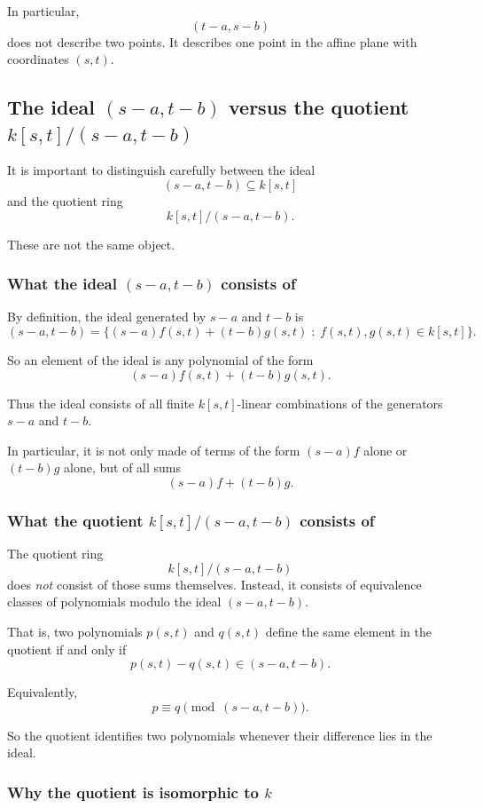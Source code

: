 \documentclass[12pt,a4paper]{article}
\theoremstyle{notespace}
\theoremstyle{definition}
\begin{document}
In particular,
\[
(t-a,s-b)
\]
does not describe two points. It describes one point in the affine plane with coordinates \((s,t)\).

\subsection{The ideal \((s-a,t-b)\) versus the quotient \(k[s,t]/(s-a,t-b)\)}

It is important to distinguish carefully between the ideal
\[
(s-a,t-b)\subseteq k[s,t]
\]
and the quotient ring
\[
k[s,t]/(s-a,t-b).
\]

These are not the same object.

\subsubsection{What the ideal \((s-a,t-b)\) consists of}

By definition, the ideal generated by \(s-a\) and \(t-b\) is
\[
(s-a,t-b)
=
\{(s-a)f(s,t)+(t-b)g(s,t)\;:\; f(s,t),g(s,t)\in k[s,t]\}.
\]

So an element of the ideal is any polynomial of the form
\[
(s-a)f(s,t)+(t-b)g(s,t).
\]

Thus the ideal consists of all finite \(k[s,t]\)-linear combinations of the generators \(s-a\) and \(t-b\).

In particular, it is not only made of terms of the form \((s-a)f\) alone or \((t-b)g\) alone, but of all sums
\[
(s-a)f+(t-b)g.
\]

\subsubsection{What the quotient \(k[s,t]/(s-a,t-b)\) consists of}

The quotient ring
\[
k[s,t]/(s-a,t-b)
\]
does \emph{not} consist of those sums themselves.  
Instead, it consists of equivalence classes of polynomials modulo the ideal \((s-a,t-b)\).

That is, two polynomials \(p(s,t)\) and \(q(s,t)\) define the same element in the quotient if and only if
\[
p(s,t)-q(s,t)\in (s-a,t-b).
\]

Equivalently,
\[
p \equiv q \pmod{(s-a,t-b)}.
\]

So the quotient identifies two polynomials whenever their difference lies in the ideal.

\subsubsection{Why the quotient is isomorphic to \(k\)}
\end{document}

